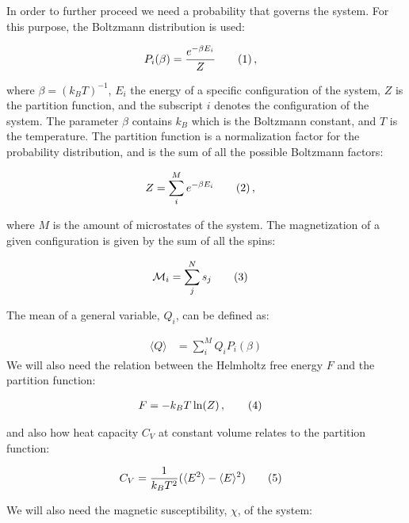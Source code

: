 \documentclass[reprint,english,notitlepage]{revtex4-1}  %
\newcommand\numberthis{\addtocounter{equation}{1}\tag{\theequation}}
\begin{document}
In order to further proceed we need a probability that governs the system. For this purpose, the Boltzmann distribution is used:

\begin{align*}
P_i (\beta) &= \frac{e^{-\beta E_i}}{Z} \numberthis \label{eq:boltzmann_dist} \, ,
\end{align*}

where $\beta = (k_B T)^{-1}$, $E_i$ the energy of a specific configuration of the system, $Z$ is the partition function, and the subscript $i$ denotes the configuration of the system. The parameter $\beta$ contains $k_B$ which is the Boltzmann constant, and $T$ is the temperature. The partition function is a normalization factor for the probability distribution, and is the sum of all the possible Boltzmann factors:

\begin{align*}
Z &= \sum\limits_i^M e^{-\beta E_i} \numberthis \label{eq:ising_partition_function} \, ,
\end{align*}  

where $M$ is the amount of microstates of the system. The magnetization of a given configuration is given by the sum of all the spins:

\begin{align*}
\mathcal{M}_i &= \sum\limits_j^N s_j \numberthis \label{eq:ising_magnetization}
\end{align*}

The mean of a general variable, $Q_i$, can be defined as:

\begin{align*}
\langle Q \rangle &= \sum\limits_i^M Q_i P_i(\beta) 
\end{align*}
We will also need the relation between the Helmholtz free energy $F$ and the partition function:

\begin{align*}
F &= -k_B T \ln (Z) \, ,\numberthis \label{eq:helmholtz_free_energy}
\end{align*}

and also how heat capacity $C_V$ at constant volume relates to the partition function:

\begin{align*}
C_V &= \frac{1}{k_B T^2} (\langle E^2 \rangle - \langle E \rangle^2) \numberthis \label{eq:heat_capacity}
\end{align*}

We will also need the magnetic susceptibility, $\chi$, of the system:
\end{document}

